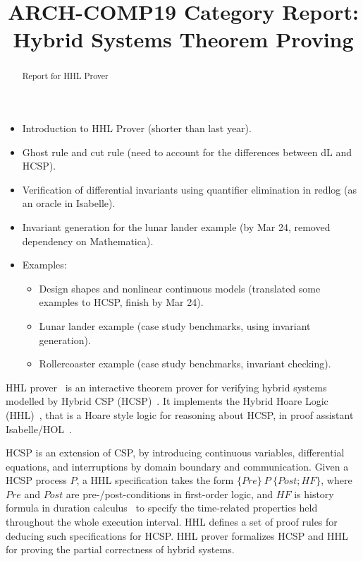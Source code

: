 \documentclass[runningheads,a4paper]{llncs}
\begin{document}
\author{}
\institute{}

\title{ARCH-COMP19 Category Report: Hybrid Systems Theorem Proving}

\maketitle

\begin{abstract}
  Report for HHL Prover
\end{abstract}

\begin{itemize}
\item Introduction to HHL Prover (shorter than last year).



\item Ghost rule and cut rule (need to account for the differences
  between dL and HCSP).
\item Verification of differential invariants using quantifier
  elimination in redlog (as an oracle in Isabelle).
\item Invariant generation for the lunar lander example (by Mar 24,
  removed dependency on Mathematica).
\item Examples:
  \begin{itemize}
  \item Design shapes and nonlinear continuous models (translated some
    examples to HCSP, finish by Mar 24).
  \item Lunar lander example (case study benchmarks, using invariant
    generation).
  \item Rollercoaster example (case study benchmarks, invariant
    checking).
  \end{itemize}
\end{itemize}

HHL prover~\cite{WZZ15} is an interactive theorem prover for verifying hybrid systems modelled by Hybrid CSP (HCSP)~\cite{He94,ZWR96}.
It implements the Hybrid Hoare Logic (HHL)~\cite{LLQZ10}, that is a Hoare style logic for reasoning about HCSP,  in proof assistant Isabelle/HOL~\cite{isabelle}.

HCSP is an extension of CSP, by  introducing continuous variables, differential equations, and interruptions by domain boundary and communication.
Given a HCSP process $P$,  a HHL specification takes the form $\{Pre\}~P~\{Post; HF\}$, where
$Pre$ and $Post$ are pre-/post-conditions in first-order logic, and $HF$  is history formula in duration calculus~\cite{ZH04} to specify the time-related properties held throughout the whole execution interval. HHL defines a set of proof rules for deducing such specifications for HCSP. HHL prover formalizes HCSP and HHL for proving the partial correctness of hybrid systems.
\end{document}
